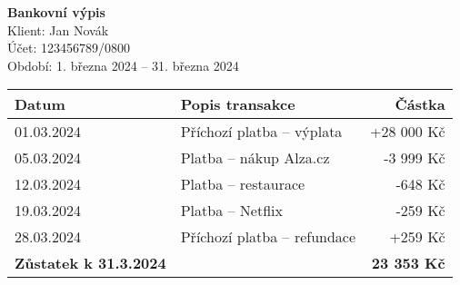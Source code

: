 \documentclass[a4paper,12pt]{article}
\begin{document}
\begin{center}
    \textbf{\Large Bankovní výpis} \\
    \vspace{0.3cm}
    Klient: Jan Novák \\
    Účet: 123456789/0800 \\
    Období: 1. března 2024 – 31. března 2024
\end{center}

\vspace{0.5cm}

\begin{tabular}{|l|l|r|}
\hline
Datum & Popis transakce & Částka \\
\hline
01.03.2024 & Příchozí platba – výplata & +28 000 Kč \\
05.03.2024 & Platba – nákup Alza.cz & -3 999 Kč \\
12.03.2024 & Platba – restaurace & -648 Kč \\
19.03.2024 & Platba – Netflix & -259 Kč \\
28.03.2024 & Příchozí platba – refundace & +259 Kč \\
\hline
\textbf{Zůstatek k 31.3.2024} & & \textbf{23 353 Kč} \\
\hline
\end{tabular}
\end{document}
